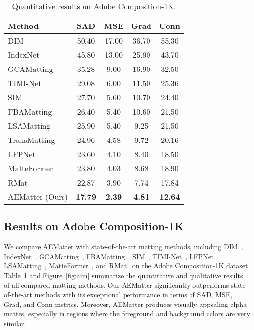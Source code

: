 \documentclass[10pt,twocolumn,letterpaper]{article}
\begin{document}
\begin{table}[!t]
  \centering
  \caption{Quantitative results on Adobe Composition-1K.
  }
\begin{tabular}{l|c|c|c|c}
        \toprule
    Method & {SAD} & {MSE} & {Grad} & {Conn} \\
    \midrule
    DIM~\cite{xu2017deep} &50.40  & 17.00  & 36.70  & 55.30  \\
    IndexNet~\cite{lu2019indices}& 45.80  & 13.00  & 25.90  & 43.70   \\
    GCAMatting~\cite{li2020natural} & 35.28  & 9.00  & 16.90  & 32.50  \\
TIMI-Net~\cite{Liu_2021_ICCV}& 29.08  & 6.00  & 11.50  & 25.36   \\
    SIM~\cite{sun2021sim}  &27.70  & 5.60  & 10.70  & 24.40  \\
    FBAMatting~\cite{forte2020fbamatting} & 26.40  & 5.40  & 10.60  & 21.50  \\
    LSAMatting~\cite{lsam} & 25.90  & 5.40  & 9.25  & 21.50  \\
        TransMatting~\cite{cai2022TransMatting}& 24.96 &4.58& 9.72& 20.16  \\
    LFPNet~\cite{liu2021lfpnet} & 23.60  & 4.10  & 8.40  & 18.50    \\
    MatteFormer~\cite{park2022matteformer}& 23.80  & 4.03  & 8.68  &18.90  \\
    RMat~\cite{dai2022boosting} & 22.87  & 3.90  & 7.74  &17.84  \\
        \midrule
    AEMatter (Ours)  &\bf{17.79}&\bf{2.39}&\bf{4.81}&\bf{12.64} \\
        \bottomrule
    \end{tabular}\label{tab:adb}\end{table}


\subsection{Results on Adobe Composition-1K}
We compare AEMatter with state-of-the-art matting methods, including DIM~\cite{xu2017deep}, IndexNet~\cite{lu2019indices}, GCAMatting~\cite{li2020natural}, FBAMatting~\cite{forte2020fbamatting}, SIM~\cite{sun2021sim}, TIMI-Net~\cite{Liu_2021_ICCV}, LFPNet~\cite{liu2021lfpnet}, LSAMatting~\cite{lsam}, MatteFormer~\cite{park2022matteformer}, and RMat~\cite{dai2022boosting} on the Adobe Composition-1K dataset. 
Table~\ref{tab:adb} and Figure~\ref{fig:aim} summarize the quantitative and qualitative results of all compared matting methods. 
Our AEMatter significantly outperforms state-of-the-art methods with its exceptional performance in terms of SAD, MSE, Grad, and Conn metrics. 
Moreover, AEMatter produces visually appealing alpha mattes, especially in regions where the foreground and background colors are very similar. 
\end{document}
